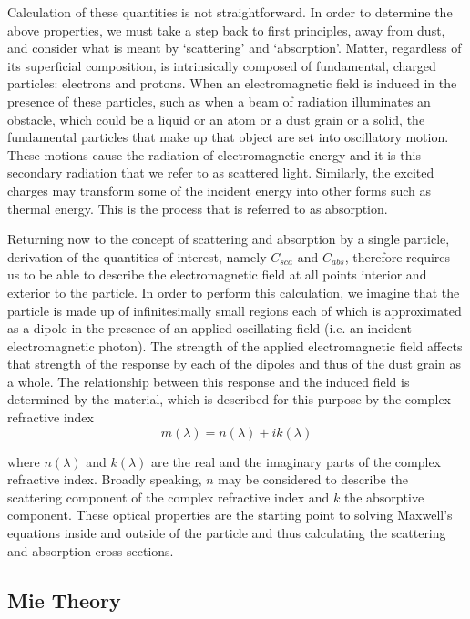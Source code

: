 Calculation of these quantities is not straightforward.  In order to determine the above properties, we must take a step back to first principles, away from dust, and consider what is meant by `scattering' and `absorption'.  Matter, regardless of its superficial composition, is intrinsically composed of fundamental, charged particles: electrons and protons.  When an electromagnetic field is induced in the presence of these particles, such as when a beam of radiation illuminates an obstacle, which could be a liquid or an atom or a dust grain or a solid, the fundamental particles that make up that object are set into oscillatory motion.  These motions cause the radiation of electromagnetic energy and it is this secondary radiation that we refer to as scattered light.  Similarly, the excited charges may transform some of the incident energy into other forms such as thermal energy.  This is the process that is referred to as absorption.

Returning now to the concept of scattering and absorption by a single particle, derivation of the quantities of interest, namely $C_{sca}$ and $C_{abs}$, therefore requires us to be able to describe the electromagnetic field at all points interior and exterior to the particle.  In order to perform this calculation, we imagine that the particle is made up of infinitesimally small regions each of which is approximated as a dipole in the presence of an applied oscillating field (i.e. an incident electromagnetic photon).  The strength of the applied electromagnetic field affects that strength of the response by each of the dipoles and thus of the dust grain as a whole.  The relationship between this response and the induced field is determined by the material, which is described for this purpose by the complex refractive index 
\begin{equation}
m(\lambda)=n(\lambda)+ik(\lambda)
\end{equation}

\noindent where $n(\lambda)$ and $k(\lambda)$ are the real and the imaginary parts of the complex refractive index.  Broadly speaking, $n$ may be considered to describe the scattering component of the complex refractive index and $k$ the absorptive component.  These optical properties are the starting point to solving Maxwell's equations inside and outside of the particle and thus calculating the scattering and absorption cross-sections.

\subsection{Mie Theory}
\label{scn:mie_theory}

